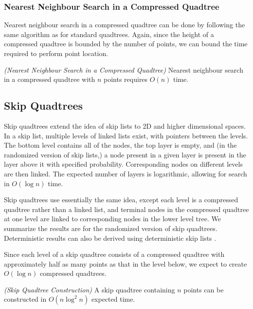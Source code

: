 \documentclass[mcs]{scsthesis}
\begin{document}
\subsubsection{Nearest Neighbour Search in a Compressed Quadtree}

Nearest neighbour search in a compressed quadtree can be done by following the
same algorithm as for standard quadtrees. Again, since the height of a compressed
quadtree is bounded by the number of points, we can bound the time required to
perform point location.

\begin{thm} \emph{(Nearest Neighbour Search in a Compressed Quadtree)} 
Nearest neighbour search in a compressed quadtree with $n$ points requires
\(O(n)\) time.
\end{thm}

\subsection{Skip Quadtrees}

Skip quadtrees extend the idea of skip lists \cite{skiplist} to 2D and higher
dimensional spaces. In a skip list, multiple levels of linked lists exist, with
pointers between the levels.  The bottom level contains all of the nodes, the
top layer is empty, and (in the randomized version of skip lists,) a node
present in a given layer is present in the layer above it with specified
probability.  Corresponding nodes on different levels are then linked. The
expected number of layers is logarithmic, allowing for search in \(O(\log n)\)
time.

Skip quadtrees use essentially the same idea, except each level is a
compressed quadtree rather than a linked list, and terminal nodes in the
compressed quadtree at one level are linked to corresponding nodes in the
lower level tree.  We summarize the results are for the randomized version of
skip quadtrees.  Deterministic results can also be derived using deterministic
skip lists \cite{skipquadtree}.

Since each level of a skip quadtree consists of a compressed quadtree with
approximately half as many points as that in the level below, we expect to
create \(O(\log n)\) compressed quadtrees.

\begin{thm} \emph{(Skip Quadtree Construction)}
A skip quadtree containing $n$ points can be constructed in \(O(n \log^2 n)\)
expected time.
\end{thm}
\end{document}
